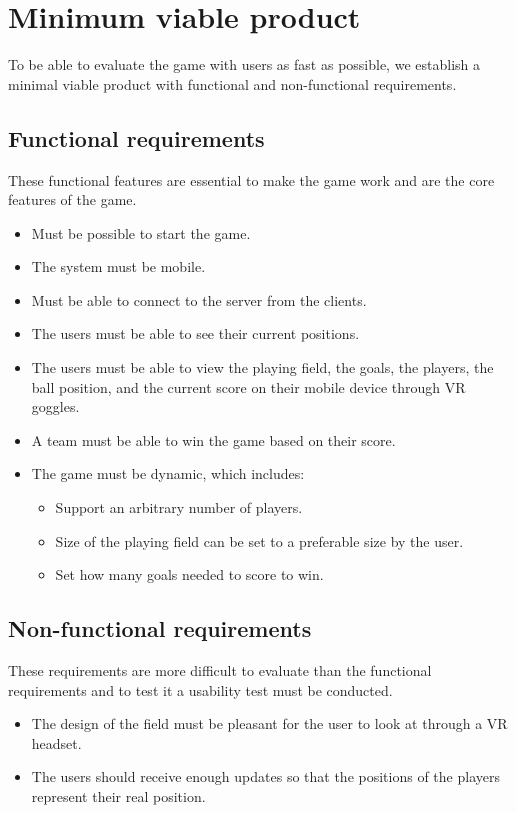 \section{Minimum viable product}\label{sec:mvp}
To be able to evaluate the game with users as fast as possible, we establish a minimal viable product with functional and non-functional requirements.

\subsection{Functional requirements}
These functional features are essential to make the game work and are the core features of the game.

\begin{itemize}
    \item Must be possible to start the game.
    \item The system must be mobile.
    \item Must be able to connect to the server from the clients.
    \item The users must be able to see their current positions.
    \item The users must be able to view the playing field, the goals, the players, the ball position, and the current score on their mobile device through VR goggles.
    \item A team must be able to win the game based on their score.
    \item The game must be dynamic, which includes:
          \begin{itemize}
              \item Support an arbitrary number of players.
              \item Size of the playing field can be set to a preferable size by the user.
              \item Set how many goals needed to score to win.
          \end{itemize}
\end{itemize}

\subsection{Non-functional requirements}
These requirements are more difficult to evaluate than the functional requirements and to test it a usability test must be conducted.
\begin{itemize}
    \item The design of the field must be pleasant for the user to look at through a VR headset.
    \item The users should receive enough updates so that the positions of the players represent their real position.
\end{itemize}
